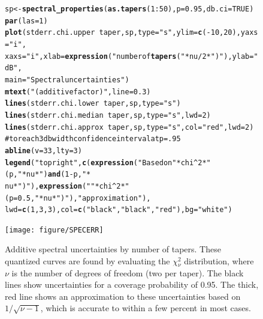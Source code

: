 \documentclass{article}\usepackage{graphicx, color}
\makeatletter
\newcommand{\hlfunctioncall}[1]{\textcolor[rgb]{0.501960784313725,0,0.329411764705882}{\textbf{#1}}}%
\newcommand{\hlstring}[1]{\textcolor[rgb]{0.6,0.6,1}{#1}}%
\newcommand{\hlcomment}[1]{\textcolor[rgb]{0.180392156862745,0.6,0.341176470588235}{#1}}%
\newenvironment{kframe}{%
 \def\at@end@of@kframe{}%
 \ifinner\ifhmode%
  \def\at@end@of@kframe{\end{minipage}}%
  \begin{minipage}{\columnwidth}%
 \fi\fi%
 \def\FrameCommand##1{\hskip\@totalleftmargin \hskip-\fboxsep
 \colorbox{shadecolor}{##1}\hskip-\fboxsep
     \hskip-\linewidth \hskip-\@totalleftmargin \hskip\columnwidth}%
 \MakeFramed {\advance\hsize-\width
   \@totalleftmargin\z@ \linewidth\hsize
   \@setminipage}}%
 {\par\unskip\endMakeFramed%
 \at@end@of@kframe}
\newenvironment{knitrout}{}{} %
\makeatother
\begin{document}
\begin{figure}[htb!]
\begin{center}
\begin{knitrout}
\color{fgcolor}\begin{kframe}
\begin{alltt}
sp <- \hlfunctioncall{spectral_properties}(\hlfunctioncall{as.tapers}(1:50), p = 0.95, db.ci = TRUE)
\hlfunctioncall{par}(las = 1)
\hlfunctioncall{plot}(stderr.chi.upper ~ taper, sp, type = \hlstring{"s"}, ylim = \hlfunctioncall{c}(-10, 20), yaxs = \hlstring{"i"}, 
    xaxs = \hlstring{"i"}, xlab = \hlfunctioncall{expression}(\hlstring{"number of \hlfunctioncall{tapers} ("} * nu/2 * \hlstring{")"}), ylab = \hlstring{"dB"}, 
    main = \hlstring{"Spectral uncertainties"})
\hlfunctioncall{mtext}(\hlstring{"(additive factor)"}, line = 0.3)
\hlfunctioncall{lines}(stderr.chi.lower ~ taper, sp, type = \hlstring{"s"})
\hlfunctioncall{lines}(stderr.chi.median ~ taper, sp, type = \hlstring{"s"}, lwd = 2)
\hlfunctioncall{lines}(stderr.chi.approx ~ taper, sp, type = \hlstring{"s"}, col = \hlstring{"red"}, lwd = 2)
\hlcomment{# to reach 3 db width confidence interval at p=.95}
\hlfunctioncall{abline}(v = 33, lty = 3)
\hlfunctioncall{legend}(\hlstring{"topright"}, \hlfunctioncall{c}(\hlfunctioncall{expression}(\hlstring{"Based on "} * chi^2 * \hlstring{"(p,"} * nu * \hlstring{") \hlfunctioncall{and} (1-p,"} * 
    nu * \hlstring{")"}), \hlfunctioncall{expression}(\hlstring{""} * chi^2 * \hlstring{"(p=0.5,"} * nu * \hlstring{")"}), \hlstring{"approximation"}), 
    lwd = \hlfunctioncall{c}(1, 3, 3), col = \hlfunctioncall{c}(\hlstring{"black"}, \hlstring{"black"}, \hlstring{"red"}), bg = \hlstring{"white"})
\end{alltt}
\end{kframe}
\texttt{[image: figure/SPECERR]} 

\end{knitrout}

\caption{Additive spectral uncertainties by number of tapers.
These quantized curves are found
by evaluating the $\chi{}_{\nu}^2$ distribution, where $\nu$ is
the number of degrees of freedom (two per taper).  
The black lines show uncertainties for a coverage probability of 0.95.
The thick, red line shows an approximation to these uncertainties
based on $1/\sqrt{\nu-1}$, which is accurate to within a few percent in most cases.
}
\label{fig:psderr}
\end{center}
\end{figure}
\end{document}
